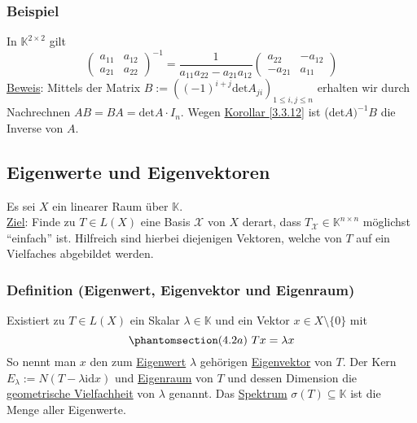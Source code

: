 \subsubsection{Beispiel}
In $\mathbb{K}^{2\times 2}$ gilt
\[\begin{pmatrix}a_{11} & a_{12}\\ a_{21} & a_{22}\end{pmatrix}^{-1}=\frac{1}{a_{11}a_{22}-a_{21}a_{12}}\begin{pmatrix}a_{22} & -a_{12}\\ -a_{21} & a_{11}\end{pmatrix}\]
\underline{Beweis}: Mittels der Matrix $B:=((-1)^{i+j}\mathrm{det}A_{ji})_{1\leq i,j\leq n}$ erhalten wir durch Nachrechnen $AB=BA=\mathrm{det}A\cdot I_n$.  Wegen \hyperref[3.3.12]{Korollar \ref{3.3.12}} ist (det$A)^{-1}B$ die Inverse von $A$.
\subsection{Eigenwerte und Eigenvektoren}
Es sei $X$ ein linearer Raum über $\mathbb{K}$.\\
\underline{Ziel}: Finde zu $T\in L(X)$ eine Basis $\mathcal{X}$ von $X$ derart, dass $T_\mathcal{X}\in\mathbb{K}^{n\times n}$ möglichst "`einfach"' ist.  Hilfreich sind hierbei diejenigen Vektoren, welche von $T$ auf ein Vielfaches abgebildet werden.
\subsubsection{Definition (Eigenwert, Eigenvektor und Eigenraum)}
\label{4.2.1}
Existiert zu $T\in L(X)$ ein Skalar $\lambda\in\mathbb{K}$ und ein Vektor $x\in X\setminus \{0 \}$ mit
\[\phantomsection\label{4.2a}(4.2a)\ Tx=\lambda x\]
So nennt man $x$ den zum \underline{Eigenwert} $\lambda$ gehörigen \underline{Eigenvektor} von $T$.  Der Kern $E_\lambda := N(T-\lambda \mathrm{id}x)$ und \underline{Eigenraum} von $T$ und dessen Dimension die \underline{geometrische Vielfachheit} von $\lambda$ genannt.  Das \underline{Spektrum} $\sigma (T)\subseteq \mathbb{K}$ ist die Menge aller Eigenwerte.
